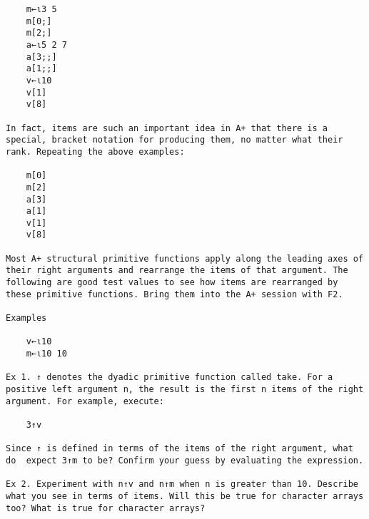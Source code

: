 \documentclass{article}
\begin{document}
\begin{verbatim}
	m←⍳3 5                                                               
	m[0;]                                                                
	m[2;]                                                                
	a←⍳5 2 7                                                             
 	a[3;;]                                                              
	a[1;;]                                                               
	v←⍳10                                                                
	v[1]                                                                 
	v[8]                                                                 

In fact, items are such an important idea in A+ that there is a       
special, bracket notation for producing them, no matter what their    
rank. Repeating the above examples:                                   

	m[0]                                                                 
	m[2]                                                                 
	a[3]                                                                 
	a[1]                                                                 
	v[1]                                                                 
	v[8]                                                                 

Most A+ structural primitive functions apply along the leading axes of
their right arguments and rearrange the items of that argument. The   
following are good test values to see how items are rearranged by     
these primitive functions. Bring them into the A+ session with F2.    

Examples                                                              

	v←⍳10                                                                
	m←⍳10 10                                                             

Ex 1. ↑ denotes the dyadic primitive function called take. For a      
positive left argument n, the result is the first n items of the right
argument. For example, execute:                                       

	3↑v                                                                  

Since ↑ is defined in terms of the items of the right argument, what  
do  expect 3↑m to be? Confirm your guess by evaluating the expression.

Ex 2. Experiment with n↑v and n↑m when n is greater than 10. Describe 
what you see in terms of items. Will this be true for character arrays
too? What is true for character arrays?                               


\end{verbatim}
\end{document}
